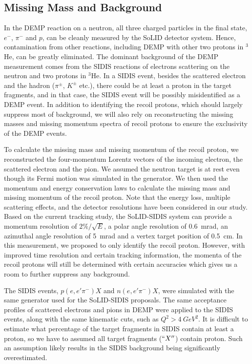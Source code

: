 \subsection{Missing Mass and Background}
In the DEMP reaction on a neutron, all three charged particles in the final
state, $e^{-}$, $\pi^{-}$ and $p$, can be cleanly measured by the SoLID
detector system.  Hence, contamination from other reactions, including DEMP
with other two protons in $^{3}$He, can be greatly eliminated.  The dominant
background of the DEMP measurement comes from the SIDIS reactions of electrons
scattering on the neutron and two protons in $\mathrm{^{3}He}$.  In a SIDIS
event, besides the scattered electron and the hadron ($\pi^{\pm}$, $K^{\pm}$
etc.), there could be at least a proton in the target fragments, and in that
case, the SIDIS event will be possibly misidentified as a DEMP event.  In
addition to identifying the recoil protons, which should largely suppress most
of background, we will also rely on reconstructing the missing masses and
missing momentum spectra of recoil protons to ensure the exclusivity of the
DEMP events.

To calculate the missing mass and missing momentum of the recoil proton, we
reconstructed the four-momentum Lorentz vectors of the incoming electron, the
scattered electron and the pion.  We assumed the neutron target is at rest even
though its Fermi motion was simulated in the generator.  We then used the
momentum and energy conservation laws to calculate the missing mass and missing
momentum of the recoil proton.  Note that the energy loss, multiple scattering
effects, and the detector resolutions have been considered in our study.  Based
on the current tracking study, the SoLID-SIDIS system can provide a momentum
resolution of $2\%/\sqrt{E}$, a polar angle resolution of 0.6~mrad, an
azimuthal angle resolution of 5~mrad and a vertex target position of 0.5~cm.
In this measurement, we proposed to only identify the recoil proton. However,
with improved time resolution and certain tracking information, the momenta of
the recoil protons will still be determined with certain accuracies which gives
us a room to further suppress any background.

The SIDIS events, $p(e,e'\pi^{-})X$ and $n(e,e'\pi^{-})X$, were simulated with
the same generator used for the SoLID-SIDIS proposals.  The same acceptance
profiles of scattered electrons and pions in DEMP were applied to the SIDIS
events, along with the same kinematic cuts, such as $Q^2>4~GeV^2$.  It is
difficult to estimate what percentage of the target fragments in SIDIS contain
at least a proton, so we have to assumed all target fragments ($``X''$) contain
proton. Such an assumption likely results in the SIDIS background being
significantly overestimated.

